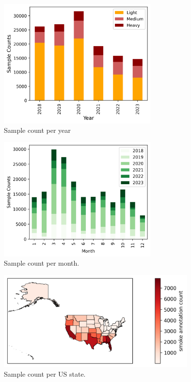 \documentclass{article}
\begin{document}
\begin{figure}
    \centering
    \includegraphics[width=8cm]{stat_figs/sample_count_per_yr.png}
    \caption{Sample count per year}\label{sample_count_per_yr}\label{count_per_yr}
\end{figure}

\begin{figure}
    \centering
    \includegraphics[width=8cm]{stat_figs/sample_count_per_month.png}
    \caption{Sample count per month.}\label{sample_count_per_month}\label{count_per_month}
\end{figure}

\begin{figure}
    \centering
    \includegraphics[width=10cm]{stat_figs/sample_count_per_state.png}
    \caption{Sample count per US state.}\label{count_per_state}
\end{figure}
\end{document}
